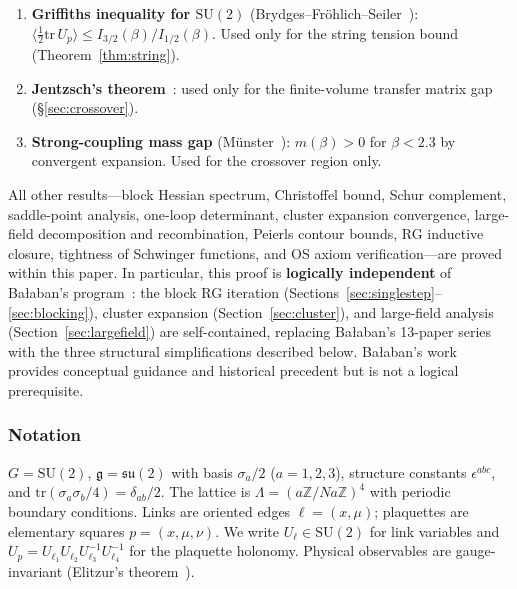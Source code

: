 \documentclass[11pt]{article}
\theoremstyle{definition}
\newcommand{\SU}{\mathrm{SU}}
\newcommand{\su}{\mathfrak{su}}
\newcommand{\tr}{\mathrm{tr}}
\newcommand{\Z}{\mathbb{Z}}
\begin{document}
\begin{enumerate}[nosep,label=(A\arabic*)]
\item \textbf{Griffiths inequality for $\SU(2)$}
(Brydges--Fr\"ohlich--Seiler~\cite{FroehlichSimon}):
$\langle\frac{1}{2}\tr\,U_p\rangle\le I_{3/2}(\beta)/I_{1/2}(\beta)$.
Used only for the string tension bound
(Theorem~\ref{thm:string}).
\item \textbf{Jentzsch's theorem}~\cite{Seiler82}: used only
for the finite-volume transfer matrix gap
(\S\ref{sec:crossover}).
\item \textbf{Strong-coupling mass gap} (M\"unster~\cite{Munster81}):
$m(\beta)>0$ for $\beta<2.3$ by convergent expansion.
Used for the crossover region only.
\end{enumerate}

\noindent All other results---block Hessian spectrum, Christoffel
bound, Schur complement, saddle-point analysis, one-loop
determinant, cluster expansion convergence, large-field
decomposition and recombination, Peierls contour bounds, RG
inductive closure, tightness of Schwinger functions, and
OS axiom verification---are proved within this
paper.  In particular, this proof is \textbf{logically independent}
of Ba\l aban's program~\cite{BalabanI,BalabanII,BalabanIII,BalabanLF1,BalabanLF2}:
the block RG iteration (Sections~\ref{sec:singlestep}--\ref{sec:blocking}),
cluster expansion (Section~\ref{sec:cluster}), and large-field analysis
(Section~\ref{sec:largefield}) are self-contained, replacing Ba\l aban's
13-paper series with the three structural simplifications described
below.  Ba\l aban's work provides conceptual guidance and historical
precedent but is not a logical prerequisite.

\subsubsection*{Notation} $G=\SU(2)$, $\mathfrak{g}=\su(2)$ with basis
$\sigma_a/2$ ($a=1,2,3$), structure constants $\epsilon^{abc}$,
and $\tr(\sigma_a\sigma_b/4)=\delta_{ab}/2$.  The lattice is
$\Lambda=(a\Z/Na\Z)^4$ with periodic boundary conditions.  Links are
oriented edges $\ell=(x,\mu)$; plaquettes are elementary squares
$p=(x,\mu,\nu)$.  We write $U_\ell\in\SU(2)$ for link variables and
$U_p=U_{\ell_1}U_{\ell_2}U_{\ell_3}^{-1}U_{\ell_4}^{-1}$ for the
plaquette holonomy.  Physical observables are gauge-invariant
(Elitzur's theorem~\cite{Elitzur75}).

\end{document}
